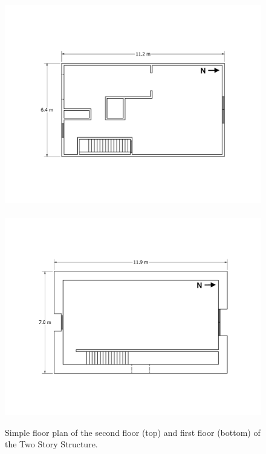 \documentclass[12pt,oneside]{book}
\begin{document}
\begin{figure}[!ht]
	\includegraphics[width=.985\columnwidth]{../Figures/Floor_Plans/West_Test_Structure_2nd_Floor_Dimensioned_LxW}
	\\~\\
	\includegraphics[width=\columnwidth]{../Figures/Floor_Plans/West_Test_Structure_1st_Floor_Dimensioned_LxW}
	\caption[Simple floor plan of the first and second floors of the Two Story Structure.]{Simple floor plan of the second floor (top) and first floor (bottom) of the Two Story Structure.}
	\label{fig:west_dimensioned_plan}
\end{figure}

\clearpage
\end{document}
